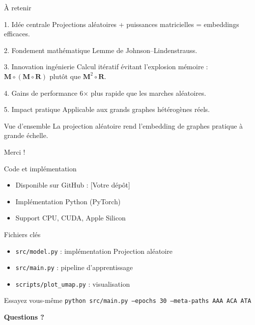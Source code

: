 \documentclass[9pt,aspectratio=169,professionalfonts]{beamer}
\begin{document}
\begin{frame}{À retenir}
\begin{block}{1. Idée centrale}
Projections aléatoires + puissances matricielles = embeddings efficaces.
\end{block}

\begin{block}{2. Fondement mathématique}
Lemme de Johnson–Lindenstrauss.
\end{block}

\begin{block}{3. Innovation ingénierie}
Calcul itératif évitant l'explosion mémoire : $\mathbf M \circ (\mathbf M \circ \mathbf R)$ plutôt que $\mathbf M^2 \circ \mathbf R$.
\end{block}

\begin{block}{4. Gains de performance}
6× plus rapide que les marches aléatoires.
\end{block}

\begin{block}{5. Impact pratique}
Applicable aux grands graphes hétérogènes réels.
\end{block}

\begin{alertblock}{Vue d'ensemble}
La projection aléatoire rend l'embedding de graphes pratique à grande échelle.
\end{alertblock}
\end{frame}

\begin{frame}{Merci !}
\begin{block}{Code et implémentation}
\begin{itemize}
    \item Disponible sur GitHub : [Votre dépôt]
    \item Implémentation Python (PyTorch)
    \item Support CPU, CUDA, Apple Silicon
\end{itemize}
\end{block}

\begin{block}{Fichiers clés}
\begin{itemize}
    \item \texttt{src/model.py} : implémentation Projection aléatoire
    \item \texttt{src/main.py} : pipeline d'apprentissage
    \item \texttt{scripts/plot\_umap.py} : visualisation
\end{itemize}
\end{block}

\begin{block}{Essayez vous-même}
\texttt{python src/main.py --epochs 30 --meta-paths AAA ACA ATA}
\end{block}

\begin{center}
\Huge \textbf{Questions ?}
\end{center}
\end{frame}
\end{document}
